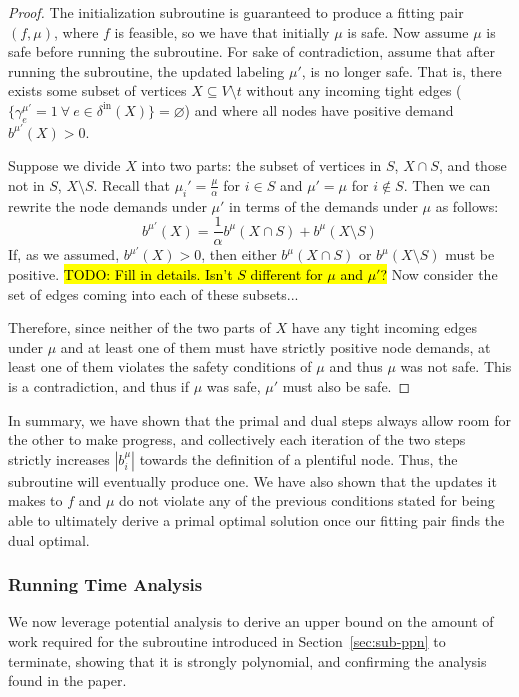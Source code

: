 \documentclass[11pt]{article}
\theoremstyle{definition}
\theoremstyle{definition}
\newcommand{\biu}{b_{i}^{\mu}}
\newcommand{\vnott}{V \setminus t}
\newcommand{\din}{\delta^{\text{in}}}
\newcommand{\fp}{(f,\mu)}
\newcommand{\todo}[1]{\hl{TODO: #1}}
\begin{document}
\begin{proof}
The initialization subroutine is guaranteed to produce a fitting pair $\fp$,
where $f$ is feasible, so we have that initially $\mu$ is safe. Now assume $\mu$
is safe before running the subroutine. For sake of contradiction, assume that
after running the subroutine, the updated labeling $\mu'$,
is no longer safe. That is, there exists some subset of vertices $X \subseteq \vnott$  
without any incoming tight edges ($\{\gamma_e^{\mu'} = 1\ \forall\ e \in \din(X)\} = \varnothing$)
and where all nodes have positive demand $b^{\mu'}(X) > 0$.

Suppose we divide $X$ into two parts: the subset of vertices in $S$, $X \cap S$, and those
not in $S$, $X \setminus S$. Recall that $\mu_i' = \frac{\mu}{\alpha}$ for $i\in S$
and $\mu' = \mu$ for $i \notin S$. Then we can rewrite the node demands under $\mu'$
in terms of the demands under $\mu$ as follows:
$$b^{\mu'}(X) = \frac{1}{\alpha}b^{\mu}(X \cap S) + b^{\mu}(X \setminus S)$$
If, as we assumed, $b^{\mu'}(X) > 0$, then either $b^{\mu}(X \cap S)$ or 
$b^{\mu}(X \setminus S)$ must be positive.
\todo{Fill in details. Isn't $S$ different for $\mu$ and $\mu'$?}
Now consider the set of edges coming into each of these subsets...

Therefore, since neither of the two parts of $X$
have any tight incoming edges under $\mu$ and at least one of them
must have strictly positive node demands, at least one of them
violates the safety conditions of $\mu$ and thus $\mu$ was not safe.
This is a contradiction, and thus if $\mu$ was safe, $\mu'$ must also be safe.

\end{proof}

In summary, we have shown that the primal and dual steps always allow room for the other to make progress, and collectively each iteration of the two steps strictly increases $|\biu|$ towards
the definition of a plentiful node. Thus, the subroutine will eventually produce one. We have also shown that the updates it makes to $f$ and $\mu$ do not violate any of the previous conditions stated for being able to ultimately derive a primal optimal solution once our fitting pair finds the dual optimal. 

\subsubsection{Running Time Analysis}

We now leverage potential analysis to derive an upper bound on the amount of work required for the subroutine introduced in Section~\ref{sec:sub-ppn} to terminate, showing that it is strongly polynomial, and confirming the analysis found in the paper. 
\end{document}
